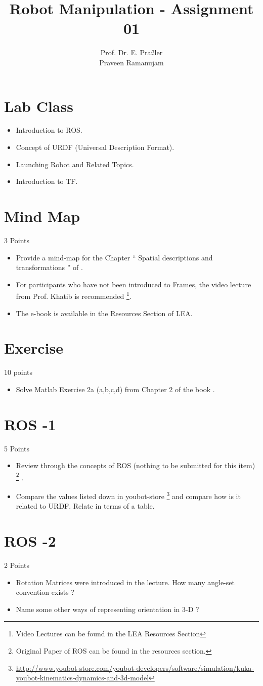 \documentclass[a4paper,10pt]{article}
\date{\displaydate{date}}
\title{Robot Manipulation - Assignment 01}
\author{Prof. Dr. E. Pra{\ss}ler \\Praveen Ramanujam}
\begin{document}
\maketitle


\section{Lab Class}
\begin{itemize}
 \item Introduction to ROS.
 \item Concept of URDF (Universal Description Format).
 \item Launching Robot and Related Topics.
 \item Introduction to TF.
\end{itemize}



\section{Mind Map}3 Points
\begin{itemize}
 \item Provide a mind-map for the Chapter `` Spatial descriptions and transformations
 '' of \cite{Craig}.
 \item For participants who have not been introduced to Frames, the video lecture from Prof. Khatib is recommended
 \footnote{Video Lectures can be found in the LEA Resources Section}.
 \item The e-book is available in the Resources Section of LEA.
\end{itemize}

\section{Exercise} 10 points
\begin{itemize}
\item Solve Matlab Exercise 2a (a,b,c,d) from Chapter 2 of the book \cite{Craig}.
\end{itemize}

\section{ROS -1 } 5 Points
\begin{itemize}
 \item Review through the concepts of ROS (nothing to be submitted for this item) \footnote{Original Paper of ROS can be found in the resources section.} . 
 \item Compare the values listed down in youbot-store \footnote{\url{http://www.youbot-store.com/youbot-developers/software/simulation/kuka-youbot-kinematics-dynamics-and-3d-model}}
and compare how is it related to URDF. Relate in terms of a table.
\end{itemize}

\section{ROS -2 } 2 Points
\begin{itemize}
 \item Rotation Matrices were introduced in the lecture. How many angle-set convention exists ?
 \item Name some other ways of representing orientation in 3-D ?
 \end{itemize}




\end{document}

